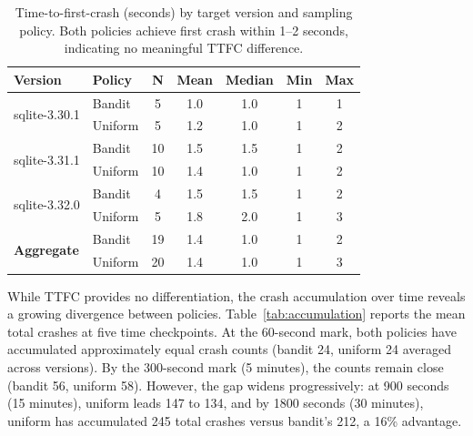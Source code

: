 \begin{table}[htbp]
\caption{Time-to-first-crash (seconds) by target version and sampling policy. Both policies achieve first crash within 1--2 seconds, indicating no meaningful TTFC difference.}
\label{tab:ttfc}
\centering
\begin{tabular}{llccccc}
\toprule
\textbf{Version} & \textbf{Policy} & \textbf{N} & \textbf{Mean} & \textbf{Median} & \textbf{Min} & \textbf{Max} \\
\midrule
\multirow{2}{*}{sqlite-3.30.1} & Bandit & 5 & 1.0 & 1.0 & 1 & 1 \\
                                & Uniform & 5 & 1.2 & 1.0 & 1 & 2 \\
\midrule
\multirow{2}{*}{sqlite-3.31.1} & Bandit & 10 & 1.5 & 1.5 & 1 & 2 \\
                                & Uniform & 10 & 1.4 & 1.0 & 1 & 2 \\
\midrule
\multirow{2}{*}{sqlite-3.32.0} & Bandit & 4 & 1.5 & 1.5 & 1 & 2 \\
                                & Uniform & 5 & 1.8 & 2.0 & 1 & 3 \\
\midrule
\multirow{2}{*}{\textbf{Aggregate}} & Bandit & 19 & 1.4 & 1.0 & 1 & 2 \\
                                     & Uniform & 20 & 1.4 & 1.0 & 1 & 3 \\
\bottomrule
\end{tabular}
\end{table}

While TTFC provides no differentiation, the crash accumulation over time reveals a growing divergence between policies. Table~\ref{tab:accumulation} reports the mean total crashes at five time checkpoints. At the 60-second mark, both policies have accumulated approximately equal crash counts (bandit 24, uniform 24 averaged across versions). By the 300-second mark (5 minutes), the counts remain close (bandit 56, uniform 58). However, the gap widens progressively: at 900 seconds (15 minutes), uniform leads 147 to 134, and by 1800 seconds (30 minutes), uniform has accumulated 245 total crashes versus bandit's 212, a 16\% advantage.

